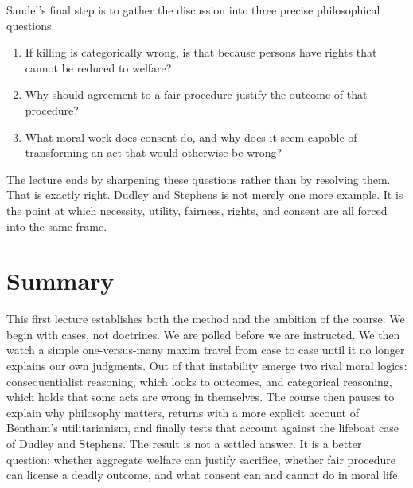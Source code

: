Sandel's final step is to gather the discussion into three precise philosophical questions.

\begin{enumerate}
\item If killing is categorically wrong, is that because persons have rights that cannot be reduced to welfare?
\item Why should agreement to a fair procedure justify the outcome of that procedure?
\item What moral work does consent do, and why does it seem capable of transforming an act that would otherwise be wrong?
\end{enumerate}

The lecture ends by sharpening these questions rather than by resolving them. That is exactly right. Dudley and Stephens is not merely one more example. It is the point at which necessity, utility, fairness, rights, and consent are all forced into the same frame.

\section{Summary}

This first lecture establishes both the method and the ambition of the course. We begin with cases, not doctrines. We are polled before we are instructed. We then watch a simple one-versus-many maxim travel from case to case until it no longer explains our own judgments. Out of that instability emerge two rival moral logics: consequentialist reasoning, which looks to outcomes, and categorical reasoning, which holds that some acts are wrong in themselves. The course then pauses to explain why philosophy matters, returns with a more explicit account of Bentham's utilitarianism, and finally tests that account against the lifeboat case of Dudley and Stephens. The result is not a settled answer. It is a better question: whether aggregate welfare can justify sacrifice, whether fair procedure can license a deadly outcome, and what consent can and cannot do in moral life.
